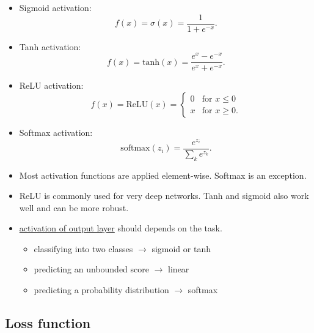 \documentclass[twocolumn,landscape,10pt]{article}
\theoremstyle{definition}
\begin{document}
\begin{itemize}
    \item Sigmoid activation:
        \[
            f(x) = \sigma(x) = \frac{1}{1 + e^{-x}}.
        \]
    \item Tanh activation:
        \[
            f(x) = \text{tanh}(x) = \frac{e^{x}-e^{-x}}{e^{x}+e^{-x}}.
        \]
    \item ReLU activation:
        \[
            f(x)=\text{ReLU}(x)=\begin{cases}
                0 & \text{for } x\le 0 \\
                x & \text{for } x\ge 0.
            \end{cases} 
        \]
    \item Softmax activation:
        \[
            \text{softmax}(z_i)=\frac{e^{z_i}}{\sum_ke^{z_k}}.
        \]
    \item Most activation functions are applied element-wise. Softmax is an
        exception.
    \item ReLU is commonly used for very deep networks. Tanh and sigmoid also
        work well and can be more robust.
    \item \underline{activation of output layer} should depends on the task.
        \begin{itemize}
            \item classifying into two classes $\rightarrow$ sigmoid or tanh
            \item predicting an unbounded score $\rightarrow$ linear
            \item predicting a probability distribution $\rightarrow$ softmax
        \end{itemize} 
\end{itemize} 

\subsection{Loss function}
\end{document}
